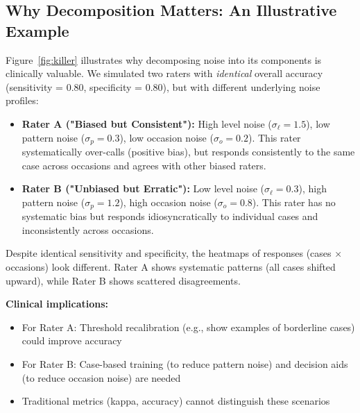 \documentclass[num-refs]{wiley-article}
\begin{document}
\subsection*{Why Decomposition Matters: An Illustrative Example}

Figure~\ref{fig:killer} illustrates why decomposing noise into its components is clinically valuable. We simulated two raters with \textit{identical} overall accuracy (sensitivity = 0.80, specificity = 0.80), but with different underlying noise profiles:

\begin{itemize}
    \item \textbf{Rater A ("Biased but Consistent"):} High level noise ($\sigma_\ell = 1.5$), low pattern noise ($\sigma_p = 0.3$), low occasion noise ($\sigma_o = 0.2$). This rater systematically over-calls (positive bias), but responds consistently to the same case across occasions and agrees with other biased raters.

    \item \textbf{Rater B ("Unbiased but Erratic"):} Low level noise ($\sigma_\ell = 0.3$), high pattern noise ($\sigma_p = 1.2$), high occasion noise ($\sigma_o = 0.8$). This rater has no systematic bias but responds idiosyncratically to individual cases and inconsistently across occasions.
\end{itemize}

Despite identical sensitivity and specificity, the heatmaps of responses (cases × occasions) look different. Rater A shows systematic patterns (all cases shifted upward), while Rater B shows scattered disagreements.

\textbf{Clinical implications:}
\begin{itemize}
    \item For Rater A: Threshold recalibration (e.g., show examples of borderline cases) could improve accuracy
    \item For Rater B: Case-based training (to reduce pattern noise) and decision aids (to reduce occasion noise) are needed
    \item Traditional metrics (kappa, accuracy) cannot distinguish these scenarios
\end{itemize}
\end{document}
